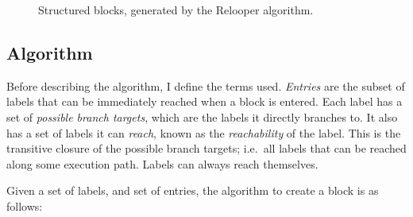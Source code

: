 \documentclass[00-main.tex]{subfiles}
\begin{document}
\begin{figure}[ht]
  \centering
  \caption{Structured blocks, generated by the Relooper algorithm.}
  \label{fig:relooper output blocks structure} %
\end{figure}

\subsection{Algorithm}\label{sec:prep:relooper algorithm}

Before describing the algorithm, I define the terms used.
\emph{Entries} are the subset of labels that can be immediately reached when a block is entered.
Each label has a set of \emph{possible branch targets}, which are the labels it directly branches to.
It also has a set of labels it can \emph{reach}, known as the \emph{reachability} of the label.
This is the transitive closure of the possible branch targets; i.e.\ all labels that can be reached along some execution path.
Labels can always reach themselves.

Given a set of labels, and set of entries, the algorithm to create a block is as follows:
\end{document}
